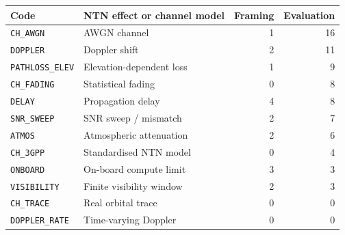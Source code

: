 \begin{tabular}{llrr}
\toprule
Code & NTN effect or channel model & Framing & Evaluation \\
\midrule
\texttt{CH\_AWGN} & AWGN channel & 1 & 16 \\
\texttt{DOPPLER} & Doppler shift & 2 & 11 \\
\texttt{PATHLOSS\_ELEV} & Elevation-dependent loss & 1 & 9 \\
\texttt{CH\_FADING} & Statistical fading & 0 & 8 \\
\texttt{DELAY} & Propagation delay & 4 & 8 \\
\texttt{SNR\_SWEEP} & SNR sweep / mismatch & 2 & 7 \\
\texttt{ATMOS} & Atmospheric attenuation & 2 & 6 \\
\texttt{CH\_3GPP} & Standardised NTN model & 0 & 4 \\
\texttt{ONBOARD} & On-board compute limit & 3 & 3 \\
\texttt{VISIBILITY} & Finite visibility window & 2 & 3 \\
\texttt{CH\_TRACE} & Real orbital trace & 0 & 0 \\
\texttt{DOPPLER\_RATE} & Time-varying Doppler & 0 & 0 \\
\bottomrule
\end{tabular}
